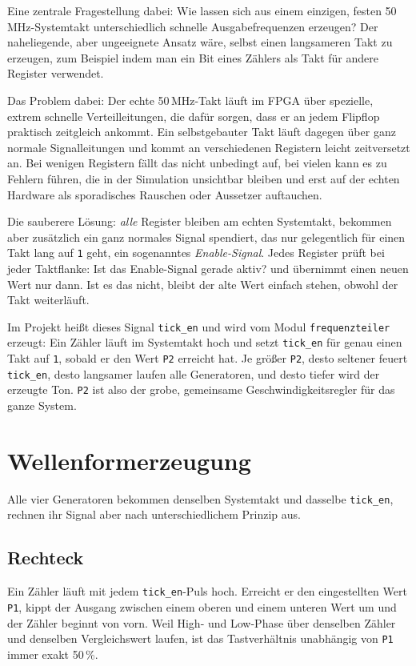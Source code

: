 Eine zentrale Fragestellung dabei: Wie lassen sich aus einem einzigen, festen 50\,MHz-Systemtakt unterschiedlich schnelle Ausgabefrequenzen erzeugen? Der naheliegende, aber ungeeignete Ansatz wäre, selbst einen langsameren Takt zu erzeugen, zum Beispiel indem man ein Bit eines Zählers als Takt für andere Register verwendet.

Das Problem dabei: Der echte 50\,MHz-Takt läuft im FPGA über spezielle, extrem schnelle Verteilleitungen, die dafür sorgen, dass er an jedem Flipflop praktisch zeitgleich ankommt. Ein selbstgebauter Takt läuft dagegen über ganz normale Signalleitungen und kommt an verschiedenen Registern leicht zeitversetzt an. Bei wenigen Registern fällt das nicht unbedingt auf, bei vielen kann es zu Fehlern führen, die in der Simulation unsichtbar bleiben und erst auf der echten Hardware als sporadisches Rauschen oder Aussetzer auftauchen.

Die sauberere Lösung: \emph{alle} Register bleiben am echten Systemtakt, bekommen aber zusätzlich ein ganz normales Signal spendiert, das nur gelegentlich für einen Takt lang auf \texttt{1} geht, ein sogenanntes \emph{Enable-Signal}. Jedes Register prüft bei jeder Taktflanke: \glqq Ist das Enable-Signal gerade aktiv?\grqq{} und übernimmt einen neuen Wert nur dann. Ist es das nicht, bleibt der alte Wert einfach stehen, obwohl der Takt weiterläuft.

Im Projekt heißt dieses Signal \texttt{tick\_en} und wird vom Modul \texttt{frequenzteiler} erzeugt: Ein Zähler läuft im Systemtakt hoch und setzt \texttt{tick\_en} für genau einen Takt auf \texttt{1}, sobald er den Wert \texttt{P2} erreicht hat. Je größer \texttt{P2}, desto seltener feuert \texttt{tick\_en}, desto langsamer laufen alle Generatoren, und desto tiefer wird der erzeugte Ton. \texttt{P2} ist also der grobe, gemeinsame Geschwindigkeitsregler für das ganze System.

\section{Wellenformerzeugung}

Alle vier Generatoren bekommen denselben Systemtakt und dasselbe \texttt{tick\_en}, rechnen ihr Signal aber nach unterschiedlichem Prinzip aus.

\subsection{Rechteck}

Ein Zähler läuft mit jedem \texttt{tick\_en}-Puls hoch. Erreicht er den eingestellten Wert \texttt{P1}, kippt der Ausgang zwischen einem oberen und einem unteren Wert um und der Zähler beginnt von vorn. Weil High- und Low-Phase über denselben Zähler und denselben Vergleichswert laufen, ist das Tastverhältnis unabhängig von \texttt{P1} immer exakt 50\,\%.

